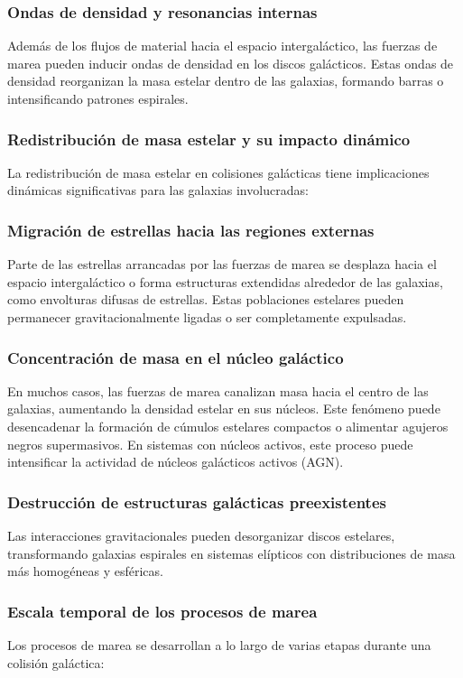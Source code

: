 \documentclass{article}
\begin{document}
\subsubsection{Ondas de densidad y resonancias internas}
Además de los flujos de material hacia el espacio intergaláctico, las fuerzas de marea pueden inducir ondas de densidad en los discos galácticos. Estas ondas de densidad reorganizan la masa estelar dentro de las galaxias, formando barras o intensificando patrones espirales.

\subsubsection{Redistribución de masa estelar y su impacto dinámico}
La redistribución de masa estelar en colisiones galácticas tiene implicaciones dinámicas significativas para las galaxias involucradas:

\subsubsection{Migración de estrellas hacia las regiones externas}
Parte de las estrellas arrancadas por las fuerzas de marea se desplaza hacia el espacio intergaláctico o forma estructuras extendidas alrededor de las galaxias, como envolturas difusas de estrellas. Estas poblaciones estelares pueden permanecer gravitacionalmente ligadas o ser completamente expulsadas.

\subsubsection{Concentración de masa en el núcleo galáctico}
En muchos casos, las fuerzas de marea canalizan masa hacia el centro de las galaxias, aumentando la densidad estelar en sus núcleos. Este fenómeno puede desencadenar la formación de cúmulos estelares compactos o alimentar agujeros negros supermasivos. En sistemas con núcleos activos, este proceso puede intensificar la actividad de núcleos galácticos activos (AGN).

\subsubsection{Destrucción de estructuras galácticas preexistentes}
Las interacciones gravitacionales pueden desorganizar discos estelares, transformando galaxias espirales en sistemas elípticos con distribuciones de masa más homogéneas y esféricas.

\subsubsection{Escala temporal de los procesos de marea}
Los procesos de marea se desarrollan a lo largo de varias etapas durante una colisión galáctica:
\end{document}
